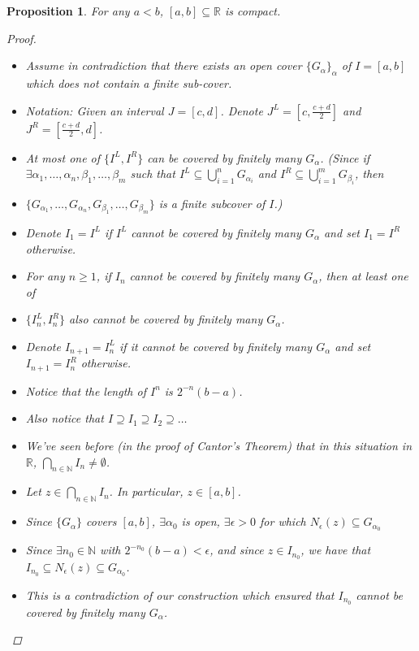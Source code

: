 \documentclass[10pt]{article}
\newcommand{\N}{\mathbb{N}}
\newcommand{\R}{\mathbb{R}}
\newtheorem{proposition}[theorem]{Proposition}
\theoremstyle{definition}
\theoremstyle{remark}
\begin{document}
\begin{proposition}
    For any $a < b$, $[a, b]\subseteq \R$ is compact.
    \begin{proof}
        \hfill
        \begin{itemize}
            \item
        Assume in contradiction that there exists an open cover $\{G_\alpha\}_{\alpha}$ of $I = [a, b]$ which does not contain a finite sub-cover.
            \item
        Notation: Given an interval $J = [c, d]$. Denote $J^L = [c, \frac{c + d}{2}]$ and $J^R = [\frac{c + d}{2}, d]$.
            \item
        At most one of $\{ I^L, I^R \}$ can be covered by finitely many $G_\alpha$.
        (Since if $\exists \alpha_1, \ldots, \alpha_n, \beta_1, \ldots, \beta_m$ such that $I^L \subseteq \bigcup_{i=1}^n G_{\alpha_i}$ and $I^R \subseteq \bigcup_{i=1}^m G_{\beta_i}$, then
            \item
        $\{G_{\alpha_1}, \ldots, G_{\alpha_n}, G_{\beta_1}, \ldots, G_{\beta_m}\}$ is a finite subcover of $I$.)
            \item
        Denote $I_1 = I^L$ if $I^L$ cannot be covered by finitely many $G_\alpha$ and set $I_1 = I^R$ otherwise.
            \item
        For  any $n \geq 1$, if $I_n$ cannot be covered by finitely many $G_\alpha$, then at least one of
            \item
        $\{I_n^L, I_n^R\}$ also cannot be covered by finitely many $G_\alpha$.
            \item
        Denote $I_{n+1} = I_n^L$ if it cannot be covered by finitely many $G_\alpha$
        and set $I_{n+1} = I_n^R$ otherwise.
            \item
        Notice that the length of $I^n$ is $2^{-n}(b - a)$.
            \item
        Also notice that
        $I \supseteq I_1 \supseteq I_2 \supseteq \ldots$
            \item
        We've seen before (in the proof of Cantor's Theorem) that in this situation in $\R$,
        $\bigcap_{n \in \N} I_n \neq \emptyset$.
            \item
        Let $z \in \bigcap_{n \in \N} I_n$. In particular, $z \in [a, b]$.
            \item
        Since $\{G_\alpha\}$ covers $[a, b]$, $\exists \alpha_0$ is open, $\exists \epsilon > 0$ for which $N_\epsilon(z) \subseteq G_{\alpha_0}$
            \item
        Since $\exists n_0 \in \N$ with $2^{-n_0}(b - a) < \epsilon$, and since $z \in I_{n_0}$, we have that $I_{n_0} \subseteq N_\epsilon(z) \subseteq G_{\alpha_0}$.
            \item
        This is a contradiction of our construction which ensured that $I_{n_0}$ cannot be covered by finitely many $G_\alpha$.
        \end{itemize}

    \end{proof}
\end{proposition}
\end{document}
